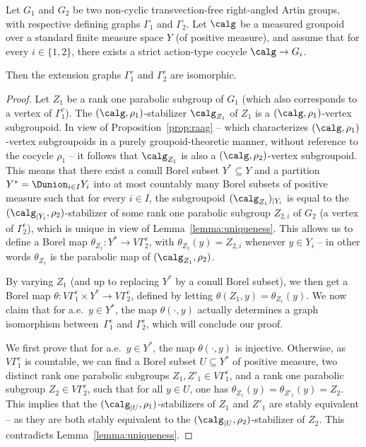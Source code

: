\begin{theo}\label{theo:main-2}
Let $G_1$ and $G_2$ be two non-cyclic transvection-free right-angled Artin groups, with respective defining graphs $\Gamma_1$ and $\Gamma_2$. Let $\calg$ be a measured groupoid over a standard finite measure space $Y$ (of positive measure), and assume that for every $i\in\{1,2\}$, there exists a strict action-type cocycle $\calg\to G_i$.

Then the extension graphs $\Gamma_1^e$ and $\Gamma_2^e$ are isomorphic.
\end{theo}

\begin{proof}
Let $Z_1$ be a rank one parabolic subgroup of $G_1$ (which also corresponds to a vertex of $\Gamma_1^e$). The $(\calg,\rho_1)$-stabilizer $\calg_{Z_1}$ of $Z_1$ is a $(\calg,\rho_1)$-vertex subgroupoid. In view of Proposition~\ref{prop:raag} -- which characterizes $(\calg,\rho_1)$-vertex subgroupoids in a purely groupoid-theoretic manner, \ie without reference to the cocycle $\rho_1$ -- it follows that $\calg_{Z_1}$ is also a $(\calg,\rho_2)$-vertex subgroupoid. This means that there exist a conull Borel subset $Y^*\subseteq Y$ and a partition $Y^*=\Dunion_{i\in I} Y_i$ into at most countably many Borel subsets of positive measure such that for every $i\in I$, the subgroupoid $(\calg_{Z_1})_{|Y_i}$ is equal to the $(\calg_{|Y_i},\rho_2)$-stabilizer of some rank one parabolic subgroup $Z_{2,i}$ of $G_2$ (\ie a vertex of $\Gamma_2^e$), which is unique in view of Lemma~\ref{lemma:uniqueness}. This allows us to define a Borel map $\theta_{Z_1}:Y^*\to V\Gamma_2^e$, with $\theta_{Z_1}(y)=Z_{2,i}$ whenever $y\in Y_i$ -- in other words $\theta_{Z_1}$ is the parabolic map of $(\calg_{Z_1},\rho_2)$.

By varying $Z_1$ (and up to replacing $Y^*$ by a conull Borel subset), we then get a Borel map $\theta:V\Gamma_1^e\times Y^*\to V\Gamma_2^e$, defined by letting $\theta(Z_1,y)=\theta_{Z_1}(y)$. We now claim that for a.e.\ $y\in Y^*$, the map $\theta(\cdot,y)$ actually determines a graph isomorphism between~$\Gamma_1^e$ and $\Gamma_2^e$, which will conclude our proof.

We first prove that for a.e.\ $y\in Y^*$, the map $\theta(\cdot,y)$ is injective. Otherwise, as $V\Gamma_1^e$ is countable, we can find a Borel subset $U\subseteq Y^*$ of positive measure, two distinct rank one parabolic subgroups $Z_1,Z'_1\in V\Gamma^e_1$, and a rank one parabolic subgroup $Z_2\in V\Gamma_2^e$, such that for all $y\in U$, one has $\theta_{Z_1}(y)=\theta_{Z'_1}(y)=Z_2$. This implies that the $(\calg_{|U},\rho_1)$-stabilizers of $Z_1$ and $Z'_1$ are stably equivalent -- as they are both stably equivalent to the $(\calg_{|U},\rho_2)$-stabilizer of $Z_2$. This contradicts Lemma~\ref{lemma:uniqueness}.


\end{proof}
